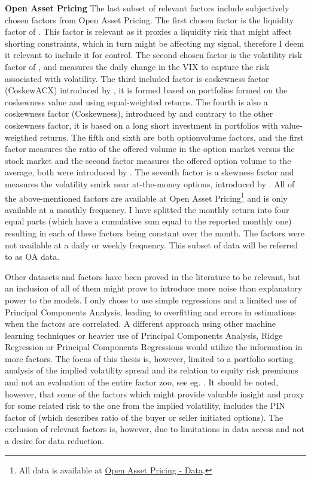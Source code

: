 \textbf{Open Asset Pricing} The last subset of relevant factors include subjectively chosen factors from Open Asset Pricing. 
The first chosen factor is the liquidity factor of \cite{pastor2003liquidity}. This factor is relevant as it proxies a liquidity risk that might affect shorting constraints, which in turn might be affecting my signal, therefore I deem it relevant to include it for control. 
The second chosen factor is the volatility risk factor of \cite{ang2006cross}, and measures the daily change in the VIX to capture the risk associated with volatility. 
The third included factor is coskewness factor (CoskewACX) introduced by \cite{ang2006downside}, it is formed based on portfolios formed on the coskewness value and using equal-weighted returns. 
The fourth is also a coskewness factor (Coskewness), introduced by \cite{harvey2000conditional} and contrary to the other coskewness factor, it is based on a long short investment in portfolios with value-weigthed returns.
The fifth and sixth are both optionvolume factors, and the first factor measures the ratio of the offered volume in the option market versus the stock market and the second factor measures the offered option volume to the average, both were introduced by \cite{johnson2012option}. 
The seventh factor is a skewness factor and measures the volatility smirk near at-the-money options, introduced by \cite{xing2010does}.
All of the above-mentioned factors are available at Open Asset Pricing\footnote{All data is available at \href{https://www.openassetpricing.com/data/}{Open Asset Pricing - Data}.} and is only available at a monthly frequency. I have splitted the monthly return into four equal parts (which have a cumulative sum equal to the reported monthly one) resulting in each of these factors being constant over the month. The factors were not available at a daily or weekly frequency. This subset of data will be referred to as OA data.

Other datasets and factors have been proved in the literature to be relevant, but an inclusion of all of them might prove to introduce more noise than explanatory power to the models. I only chose to use simple regressions and a limited use of Principal Components Analysis, leading to overfitting and errors in estimations when the factors are correlated. A different approach using other machine learning techniques or heavier use of Principal Components Analysis, Ridge Regression or Principal Components Regressions would utilize the information in more factors. The focus of this thesis is, however, limited to a portfolio sorting analysis of the implied volatility spread and its relation to equity risk premiums and not an evaluation of the entire factor zoo, see eg.  \cite{feng2017taming}. It should be noted, however, that some of the factors which might provide valuable insight and proxy for some related risk to the one from the implied volatility, includes the PIN factor of \cite{pan2006information} (which describes ratio of the buyer or seller initiated options). The exclusion of relevant factors is, however, due to limitations in data access and not a desire for data reduction.


